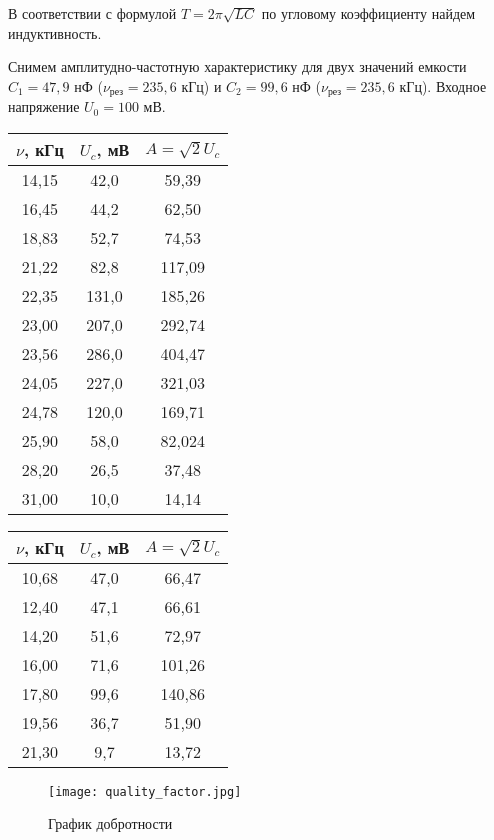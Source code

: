 	В соответствии с формулой $T = 2 \pi \sqrt{L C}$ по угловому коэффициенту найдем индуктивность.
	
	\begin{center}
	\end{center}

	Снимем амплитудно-частотную характеристику для двух значений емкости $C_1 = 47,9$ нФ ($\nu_{\text{рез}} = 235,6$ кГц) и $C_2 = 99,6$ нФ ($\nu_{\text{рез}} = 235,6$ кГц). Входное напряжение $U_0 = 100$ мВ.
	
	\newpage
	
	\begin{table}[h!]
		\begin{center}
			\begin{tabular}{|c|c|c|}
				\hline
				$\nu$, кГц & $U_c$, мВ & $A = \sqrt{2} U_c$ \\ \hline
				14,15      & 42,0      & 59,39  \\ \hline
				16,45      & 44,2      & 62,50  \\ \hline
				18,83      & 52,7      & 74,53  \\ \hline
				21,22      & 82,8      & 117,09 \\ \hline
				22,35      & 131,0     & 185,26 \\ \hline
				23,00      & 207,0     & 292,74 \\ \hline
				23,56      & 286,0     & 404,47 \\ \hline
				24,05      & 227,0     & 321,03 \\ \hline
				24,78      & 120,0     & 169,71 \\ \hline
				25,90      & 58,0      & 82,024 \\ \hline
				28,20      & 26,5      & 37,48  \\ \hline
				31,00      & 10,0      & 14,14  \\ \hline
			\end{tabular}
		\end{center}
	\end{table}

	\begin{table}[h!]
		\begin{center}
			\begin{tabular}{|c|c|c|}
				\hline
				$\nu$, кГц & $U_c$, мВ & $A = \sqrt{2} U_c$ \\ \hline
				10,68      & 47,0      & 66,47  \\ \hline
				12,40      & 47,1      & 66,61  \\ \hline
				14,20      & 51,6      & 72,97  \\ \hline
				16,00      & 71,6      & 101,26 \\ \hline
				17,80      & 99,6      & 140,86 \\ \hline
				19,56      & 36,7      & 51,90  \\ \hline
				21,30      & 9,7       & 13,72  \\ \hline
			\end{tabular}
		\end{center}
	\end{table}

	\newpage

	\begin{figure}[h!]
		\centering
		\texttt{[image: quality\_factor.jpg]}
		\caption{График добротности}
	\end{figure}
	
